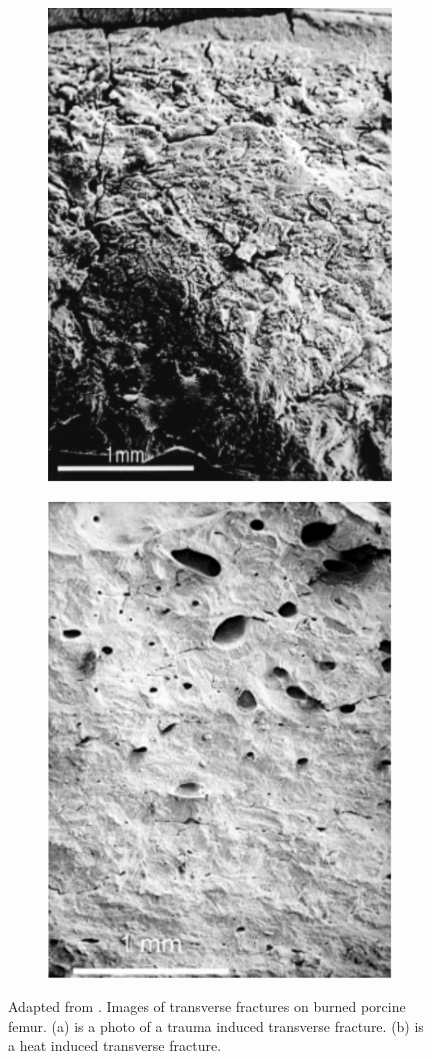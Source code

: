 \documentclass[titlepage]{article}
\begin{document}
\newpage
\begin{figure}[h!]
\centering
\begin{subfigure}{.5\textwidth}
  \centering
  \includegraphics[width=.7\linewidth]{trauma_transverse}
  \caption{}
  \end{subfigure}%
\begin{subfigure}{.5\textwidth}
  \centering
  \includegraphics[width=.7\linewidth]{heat_transverse}
  \caption{}
\end{subfigure}
\caption{Adapted from \cite{fire-bone}. Images of transverse fractures on burned porcine femur. (a) is a photo of a trauma induced transverse fracture. (b) is a heat induced transverse fracture.}
\label{fig:fracture_comp}
\end{figure}
\end{document}
